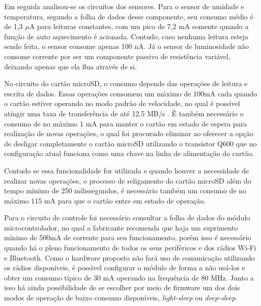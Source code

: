 Em seguida analisou-se os circuitos dos sensores. Para o sensor de umidade e temperatura, segundo a folha de dados desse componente, seu consumo médio é de 1,3 $\mu$A para leituras constantes, com um pico de 7,2 mA somente quando a função de auto aquecimento é acionada. Contudo, caso nenhuma leitura esteja sendo feita, o sensor consome apenas 100 nA. Já o sensor de luminosidade não consome corrente por ser um componente passivo de resistência variável, deixando apenas que ela flua através de si.

No circuito do cartão microSD, o consumo depende das operações de leitura e escrita de dados. Essas operações consomem um máximo de 100mA cada quando o cartão estiver operando no modo padrão de velocidade, no qual é possível atingir uma taxa de transferência de até 12.5 MB/s \cite{2010sd3sd}. É também necessário o consumo de no máximo 1 mA para manter o cartão em estado de espera para realização de novas operações, o qual foi procurado eliminar ao oferecer a opção de desligar completamente o cartão microSD utilizando o transistor Q600 que no configuração atual funciona como uma chave na linha de alimentação do cartão.

Contudo se essa funcionalidade for utilizada e quando houver a necessidade de realizar novas operações, o processo de religamento do cartão microSD além do tempo mínimo de 250 milissegundos, é necessário também um consumo de no máximo 115 mA para que o cartão entre em estado de operação. 

Para o circuito de controle foi necessário consultar a folha de dados do módulo microcontrolador, no qual a fabricante recomenda que haja um suprimento mínimo de 500mA de corrente para seu funcionamento, porém isso é necessário quando há o pleno funcionamento de todos os seus periféricos e dos rádios Wi-Fi e Bluetooth. Como o hardware proposto não fará uso de comunicação utilizando os rádios disponíveis, é possível configurar o módulo de forma a não usá-los e obter um consumo típico de 30 mA operando na frequência de 80 MHz. Junto a isso há ainda possibilidade de se escolher por meio de firmware um dos dois modos de operação de baixo consumo disponíveis, \textit{light-sleep} ou \textit{deep-sleep}. 

